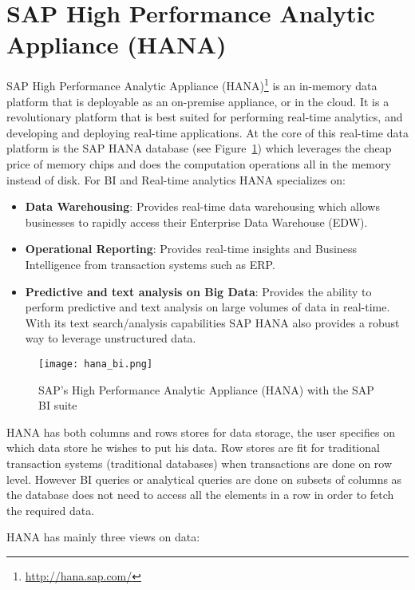 \section{SAP High Performance Analytic Appliance (HANA)}

SAP High Performance Analytic Appliance (HANA)\footnote{\url{http://hana.sap.com/}} is an in-memory data platform that is deployable as an on-premise appliance, or in the cloud. It is a revolutionary platform that is best suited for performing real-time analytics, and developing and deploying real-time applications. At the core of this real-time data platform is the SAP HANA database (see Figure~\ref{fig:hana_architecture}) which leverages the cheap price of memory chips and does the computation operations all in the memory instead of disk. For BI and Real-time analytics HANA specializes on:

\begin{itemize}
	\item \textbf{Data Warehousing}: Provides real-time data warehousing which allows businesses to rapidly access their Enterprise Data Warehouse (EDW).
	\item \textbf{Operational Reporting}: Provides real-time insights and Business Intelligence from transaction systems such as ERP.
	\item \textbf{Predictive and text analysis on Big Data}: Provides the ability to perform predictive and text analysis on large volumes of data in real-time. With its text search/analysis capabilities SAP HANA also provides a robust way to leverage unstructured data.
\end{itemize}

\begin{figure}[ht]
\centering
	\texttt{[image: hana\_bi.png]}
	\caption{SAP's High Performance Analytic Appliance (HANA) with the SAP BI suite}
	\label{fig:hana_architecture}
\end{figure}

HANA has both columns and rows stores for data storage, the user specifies on which data store he wishes to put his data. Row stores are fit for traditional transaction systems (traditional databases) when transactions are done on row level. However BI queries or analytical queries are done on subsets of columns as the database does not need to access all the elements in a row in order to fetch the required data.

HANA has mainly three views on data:

